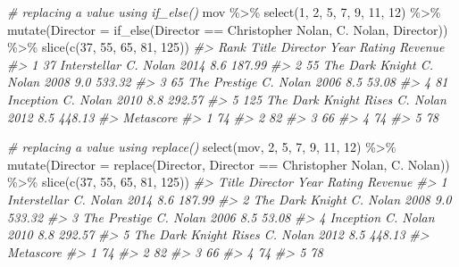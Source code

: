 \documentclass[
]{book}
\newenvironment{Shaded}{\begin{snugshade}}{\end{snugshade}}
\newcommand{\AttributeTok}[1]{\textcolor[rgb]{0.77,0.63,0.00}{#1}}
\newcommand{\CommentTok}[1]{\textcolor[rgb]{0.56,0.35,0.01}{\textit{#1}}}
\newcommand{\DecValTok}[1]{\textcolor[rgb]{0.00,0.00,0.81}{#1}}
\newcommand{\FunctionTok}[1]{\textcolor[rgb]{0.00,0.00,0.00}{#1}}
\newcommand{\NormalTok}[1]{#1}
\newcommand{\SpecialCharTok}[1]{\textcolor[rgb]{0.00,0.00,0.00}{#1}}
\newcommand{\StringTok}[1]{\textcolor[rgb]{0.31,0.60,0.02}{#1}}
\begin{document}
\begin{Shaded}
\begin{Highlighting}[]
\CommentTok{\# replacing a value using if\_else()}
\NormalTok{mov }\SpecialCharTok{\%\textgreater{}\%}
  \FunctionTok{select}\NormalTok{(}\DecValTok{1}\NormalTok{, }\DecValTok{2}\NormalTok{, }\DecValTok{5}\NormalTok{, }\DecValTok{7}\NormalTok{, }\DecValTok{9}\NormalTok{, }\DecValTok{11}\NormalTok{, }\DecValTok{12}\NormalTok{) }\SpecialCharTok{\%\textgreater{}\%}
  \FunctionTok{mutate}\NormalTok{(}\AttributeTok{Director =} \FunctionTok{if\_else}\NormalTok{(Director }\SpecialCharTok{==} \StringTok{\textquotesingle{}Christopher Nolan\textquotesingle{}}\NormalTok{, }\StringTok{\textquotesingle{}C. Nolan\textquotesingle{}}\NormalTok{, Director)) }\SpecialCharTok{\%\textgreater{}\%}
  \FunctionTok{slice}\NormalTok{(}\FunctionTok{c}\NormalTok{(}\DecValTok{37}\NormalTok{, }\DecValTok{55}\NormalTok{, }\DecValTok{65}\NormalTok{, }\DecValTok{81}\NormalTok{, }\DecValTok{125}\NormalTok{))}
\CommentTok{\#\textgreater{}   Rank                 Title Director Year Rating Revenue}
\CommentTok{\#\textgreater{} 1   37          Interstellar C. Nolan 2014    8.6  187.99}
\CommentTok{\#\textgreater{} 2   55       The Dark Knight C. Nolan 2008    9.0  533.32}
\CommentTok{\#\textgreater{} 3   65          The Prestige C. Nolan 2006    8.5   53.08}
\CommentTok{\#\textgreater{} 4   81             Inception C. Nolan 2010    8.8  292.57}
\CommentTok{\#\textgreater{} 5  125 The Dark Knight Rises C. Nolan 2012    8.5  448.13}
\CommentTok{\#\textgreater{}   Metascore}
\CommentTok{\#\textgreater{} 1        74}
\CommentTok{\#\textgreater{} 2        82}
\CommentTok{\#\textgreater{} 3        66}
\CommentTok{\#\textgreater{} 4        74}
\CommentTok{\#\textgreater{} 5        78}

\CommentTok{\# replacing a value using replace()}
\FunctionTok{select}\NormalTok{(mov, }\DecValTok{2}\NormalTok{, }\DecValTok{5}\NormalTok{, }\DecValTok{7}\NormalTok{, }\DecValTok{9}\NormalTok{, }\DecValTok{11}\NormalTok{, }\DecValTok{12}\NormalTok{) }\SpecialCharTok{\%\textgreater{}\%}
  \FunctionTok{mutate}\NormalTok{(}\AttributeTok{Director =} \FunctionTok{replace}\NormalTok{(Director, Director }\SpecialCharTok{==} \StringTok{\textquotesingle{}Christopher Nolan\textquotesingle{}}\NormalTok{, }\StringTok{\textquotesingle{}C. Nolan\textquotesingle{}}\NormalTok{)) }\SpecialCharTok{\%\textgreater{}\%}
  \FunctionTok{slice}\NormalTok{(}\FunctionTok{c}\NormalTok{(}\DecValTok{37}\NormalTok{, }\DecValTok{55}\NormalTok{, }\DecValTok{65}\NormalTok{, }\DecValTok{81}\NormalTok{, }\DecValTok{125}\NormalTok{))}
\CommentTok{\#\textgreater{}                   Title Director Year Rating Revenue}
\CommentTok{\#\textgreater{} 1          Interstellar C. Nolan 2014    8.6  187.99}
\CommentTok{\#\textgreater{} 2       The Dark Knight C. Nolan 2008    9.0  533.32}
\CommentTok{\#\textgreater{} 3          The Prestige C. Nolan 2006    8.5   53.08}
\CommentTok{\#\textgreater{} 4             Inception C. Nolan 2010    8.8  292.57}
\CommentTok{\#\textgreater{} 5 The Dark Knight Rises C. Nolan 2012    8.5  448.13}
\CommentTok{\#\textgreater{}   Metascore}
\CommentTok{\#\textgreater{} 1        74}
\CommentTok{\#\textgreater{} 2        82}
\CommentTok{\#\textgreater{} 3        66}
\CommentTok{\#\textgreater{} 4        74}
\CommentTok{\#\textgreater{} 5        78}


\end{Highlighting}
\end{Shaded}
\end{document}
